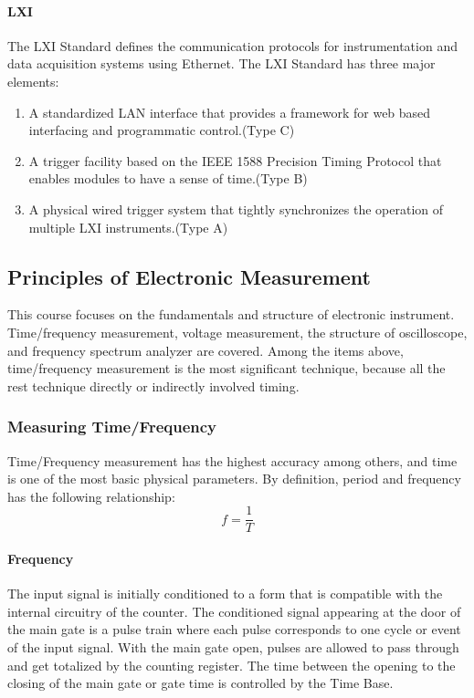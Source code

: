 \paragraph{LXI} The LXI Standard defines the communication protocols for instrumentation and data acquisition systems using Ethernet. The LXI Standard has three major elements:
\begin{enumerate}
  \item A standardized LAN interface that provides a framework for web based interfacing and programmatic control.(Type C)
  \item A trigger facility based on the IEEE 1588 Precision Timing Protocol that enables modules to have a sense of time.(Type B)
  \item A physical wired trigger system that tightly synchronizes the operation of multiple LXI instruments.(Type A)
\end{enumerate}

\subsection{Principles of Electronic Measurement}
This course focuses on the fundamentals and structure of electronic instrument. Time/frequency measurement, voltage measurement, the structure of oscilloscope, and frequency spectrum analyzer are covered. Among the items above, time/frequency measurement is the most significant technique, because all the rest technique directly or indirectly involved timing.

\subsubsection{Measuring Time/Frequency}

Time/Frequency measurement has the highest accuracy among others, and time is one of the most basic physical parameters. By definition, period and frequency has the following relationship:
$$f=\frac{1}{T}$$
\paragraph{Frequency} The input signal is initially conditioned to a form that is compatible with the internal circuitry of the counter. The conditioned signal appearing at the door of the main gate is a pulse train where each pulse corresponds to one cycle or event of the input signal. With the main gate open, pulses are allowed to pass through and get totalized by the counting register. The time between the opening to the closing of the main gate or gate time is controlled by the Time Base.

